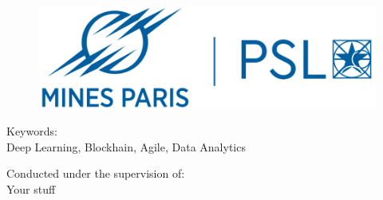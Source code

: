 

\begin{titlepage}
    \begin{center}
    
        \begin{figure}[!htb]
          \centering
           \begin{minipage}{0.42\textwidth}
             \centering
             \makeatletter
             \includegraphics[width=\linewidth]{../figs/logo/mines.png}
             \makeatother
           \end{minipage}\hfill
        \end{figure}

        \maketitle

        \vspace{2cm}
        \large 
        Keywords:\\
        Deep Learning, Blockhain, Agile, Data Analytics
        
        \vspace{5.5cm}
        \normalsize
        Conducted under the supervision of: \\
            Your stuff
        
        
    \end{center}
\end{titlepage}

\thispagestyle{empty}
\cleardoublepage

